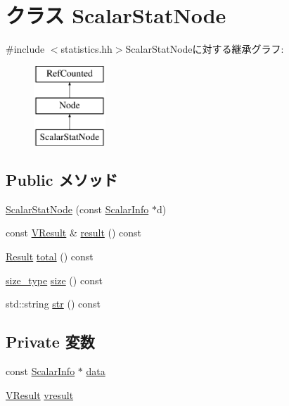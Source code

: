 \hypertarget{classStats_1_1ScalarStatNode}{
\section{クラス ScalarStatNode}
\label{classStats_1_1ScalarStatNode}
}


{\ttfamily \#include $<$statistics.hh$>$}ScalarStatNodeに対する継承グラフ:\begin{figure}[H]
\begin{center}
\leavevmode
\includegraphics[height=3cm]{classStats_1_1ScalarStatNode}
\end{center}
\end{figure}
\subsection*{Public メソッド}
\begin{DoxyCompactItemize}
\item 
\hyperlink{classStats_1_1ScalarStatNode_aba24d0ae5b7375423d6e04e1e1277bc6}{ScalarStatNode} (const \hyperlink{classStats_1_1ScalarInfo}{ScalarInfo} $\ast$d)
\item 
const \hyperlink{classstd_1_1vector}{VResult} \& \hyperlink{classStats_1_1ScalarStatNode_aba312f9e3431b1652f8b3ddf3fe105dc}{result} () const 
\item 
\hyperlink{namespaceStats_ad874d2cfd4b4a29ebd480bb2e67f20ae}{Result} \hyperlink{classStats_1_1ScalarStatNode_a35c6e2ed3fc81b40d69052a062113ead}{total} () const 
\item 
\hyperlink{namespaceStats_ada51e68d31936547d3729c82daf6b7c6}{size\_\-type} \hyperlink{classStats_1_1ScalarStatNode_a503ab01f6c0142145d3434f6924714e7}{size} () const 
\item 
std::string \hyperlink{classStats_1_1ScalarStatNode_a1b9b8885b0880fc4ddf9a2c7d1ca3dc4}{str} () const 
\end{DoxyCompactItemize}
\subsection*{Private 変数}
\begin{DoxyCompactItemize}
\item 
const \hyperlink{classStats_1_1ScalarInfo}{ScalarInfo} $\ast$ \hyperlink{classStats_1_1ScalarStatNode_af5e53ba08d05b6fbfbae1ca8405fa350}{data}
\item 
\hyperlink{classstd_1_1vector}{VResult} \hyperlink{classStats_1_1ScalarStatNode_a8f41af856442757ec68f3391333d3eb2}{vresult}
\end{DoxyCompactItemize}


